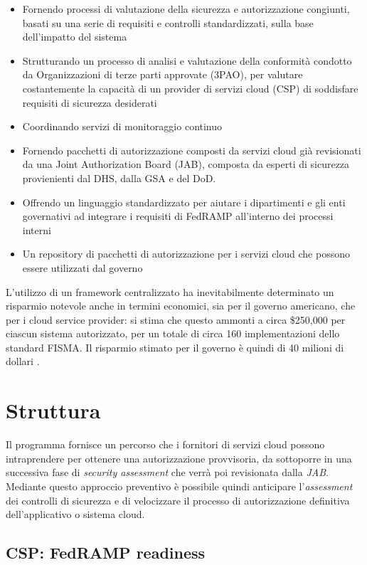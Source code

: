 \documentclass[../main.tex]{subfiles}
\begin{document}
\begin{itemize}
    \item Fornendo processi di valutazione della sicurezza e autorizzazione congiunti, basati su una serie di requisiti e controlli standardizzati, sulla base dell'impatto del sistema 
    \item Strutturando un processo di analisi e valutazione della conformità condotto da Organizzazioni di terze parti approvate (3PAO), per valutare costantemente la capacità di un provider di servizi cloud (CSP) di soddisfare requisiti di sicurezza desiderati
    \item Coordinando servizi di monitoraggio continuo
    \item Fornendo pacchetti di autorizzazione composti da servizi cloud già revisionati da una Joint Authorization Board (JAB), composta da esperti di sicurezza provienienti dal DHS, dalla GSA e del DoD. 
    \item Offrendo un linguaggio standardizzato per aiutare i dipartimenti e gli enti governativi ad integrare i requisiti di FedRAMP all'interno dei processi interni
    \item Un repository di pacchetti di autorizzazione per i servizi cloud che possono essere utilizzati dal governo
\end{itemize}

L'utilizzo di un framework centralizzato ha inevitabilmente determinato un risparmio notevole anche in termini economici, sia per il governo americano, che per i cloud service provider: si stima che questo ammonti a circa \$250,000 per ciascun sistema autorizzato, per un totale di circa 160 implementazioni dello standard FISMA. Il risparmio stimato per il governo è quindi di 40 milioni di dollari \cite{7036263}.
\section{Struttura}
Il programma fornisce un percorso che i fornitori di servizi cloud possono intraprendere per ottenere una autorizzazione provvisoria, da sottoporre in una successiva fase di \textit{security assessment} che verrà poi revisionata dalla \textit{JAB}.
Mediante questo approccio preventivo è possibile quindi anticipare l'\textit{assessment} dei controlli di sicurezza e di velocizzare il processo di autorizzazione definitiva dell'applicativo o sistema cloud.
\subsection{CSP: FedRAMP readiness}
\end{document}

